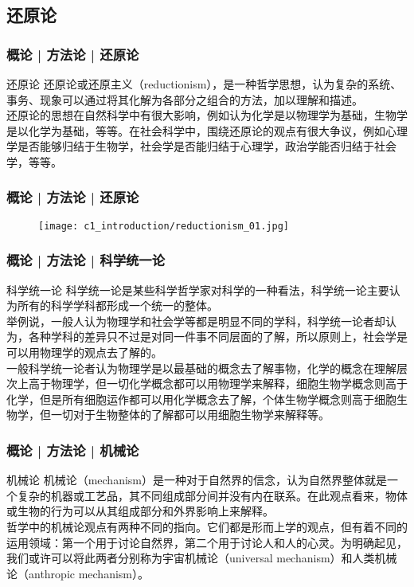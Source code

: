 \subsection{还原论}
\begin{frame}
  \frametitle{概论 | 方法论 | 还原论}
  \begin{block}{还原论}
还原论或还原主义（reductionism），是一种哲学思想，认为复杂的系统、事务、现象可以通过将其化解为各部分之组合的方法，加以理解和描述。\\
\vspace{1em}
还原论的思想在自然科学中有很大影响，例如认为化学是以物理学为基础，生物学是以化学为基础，等等。在社会科学中，围绕还原论的观点有很大争议，例如心理学是否能够归结于生物学，社会学是否能归结于心理学，政治学能否归结于社会学，等等。
  \end{block}
\end{frame}

\begin{frame}
  \frametitle{概论 | 方法论 | 还原论}
  \begin{figure}
    \centering
    \texttt{[image: c1\_introduction/reductionism\_01.jpg]}
  \end{figure}
\end{frame}

\begin{frame}
  \frametitle{概论 | 方法论 | 科学统一论}
  \begin{block}{科学统一论}
科学统一论是某些科学哲学家对科学的一种看法，科学统一论主要认为所有的科学学科都形成一个统一的整体。\\
\vspace{1em}
举例说，一般人认为物理学和社会学等都是明显不同的学科，科学统一论者却认为，各种学科的差异只不过是对同一件事不同层面的了解，所以原则上，社会学是可以用物理学的观点去了解的。\\
\vspace{1em}
一般科学统一论者认为物理学是以最基础的概念去了解事物，化学的概念在理解层次上高于物理学，但一切化学概念都可以用物理学来解释，细胞生物学概念则高于化学，但是所有细胞运作都可以用化学概念去了解，个体生物学概念则高于细胞生物学，但一切对于生物整体的了解都可以用细胞生物学来解释等。
  \end{block}
\end{frame}

\begin{frame}
  \frametitle{概论 | 方法论 | 机械论}
  \begin{block}{机械论}
机械论（mechanism）是一种对于自然界的信念，认为自然界整体就是一个复杂的机器或工艺品，其不同组成部分间并没有内在联系。在此观点看来，物体或生物的行为可以从其组成部分和外界影响上来解释。\\
\vspace{1em}
哲学中的机械论观点有两种不同的指向。它们都是形而上学的观点，但有着不同的运用领域：第一个用于讨论自然界，第二个用于讨论人和人的心灵。为明确起见，我们或许可以将此两者分别称为宇宙机械论（universal mechanism）和人类机械论（anthropic mechanism）。
  \end{block}
\end{frame}

